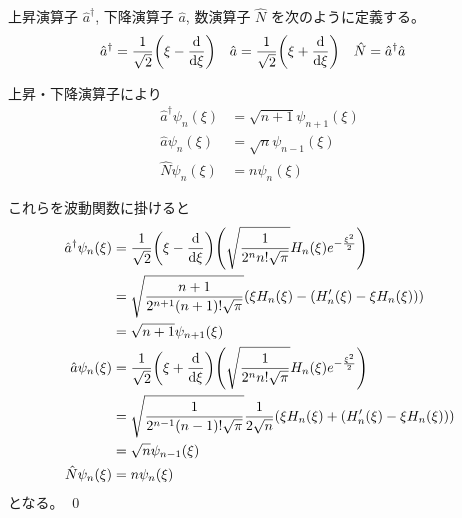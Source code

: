 \documentclass[uplatex,dvipdfmx,a4paper,11pt]{jlreq}
\makeatletter
\numberwithin{equation}{section}
\theoremstyle{definition}
\renewenvironment{proof}[1][\proofname]{\par
  \normalfont
  \topsep6\p@\@plus6\p@ \trivlist
  \item[\hskip\labelsep{\bfseries #1}\@addpunct{\bfseries}]\ignorespaces\quad\par
}{%
  \qed\endtrivlist\@endpefalse
}
\renewcommand\proofname{証明}
\makeatother
\begin{document}
\begin{definition}
  上昇演算子 $\hat{a}^\dagger$, 下降演算子 $\hat{a}$, 数演算子 $\hat{N}$ を次のように定義する。
  \begin{align}
    \hat{a}^\dagger & = \frac{1}{\sqrt{2}}\qty(\xi - \dv{\xi}) & \hat{a} & = \frac{1}{\sqrt{2}}\qty(\xi + \dv{\xi}) & \hat{N} & = \hat{a}^\dagger\hat{a}
  \end{align}
\end{definition}

\begin{proposition}
  上昇・下降演算子により
  \begin{align}
    \hat{a}^\dagger\psi_n(\xi) & = \sqrt{n+1}\psi_{n+1}(\xi) \\
    \hat{a}\psi_n(\xi)         & = \sqrt{n}\psi_{n-1}(\xi)   \\
    \hat{N}\psi_n(\xi)         & = n\psi_n(\xi)
  \end{align}
\end{proposition}
\begin{proof}
  これらを波動関数に掛けると
  \begin{align}
    \hat{a}^\dagger\psi_n(\xi) & = \frac{1}{\sqrt{2}}\qty(\xi - \dv{\xi})\qty(\sqrt{\frac{1}{2^nn!\sqrt{\pi}}}H_n(\xi)e^{-\frac{\xi^2}{2}})   \\
                               & = \sqrt{\frac{n+1}{2^{n+1}(n+1)!\sqrt{\pi}}}\qty(\xi H_n(\xi) - (H_n'(\xi) - \xi H_n(\xi)))                  \\
                               & = \sqrt{n+1}\psi_{n+1}(\xi)                                                                                  \\
    \hat{a}\psi_n(\xi)         & = \frac{1}{\sqrt{2}}\qty(\xi + \dv{\xi})\qty(\sqrt{\frac{1}{2^nn!\sqrt{\pi}}}H_n(\xi)e^{-\frac{\xi^2}{2}})   \\
                               & = \sqrt{\frac{1}{2^{n-1}(n-1)!\sqrt{\pi}}}\frac{1}{2\sqrt{n}}\qty(\xi H_n(\xi) + (H_n'(\xi) - \xi H_n(\xi))) \\
                               & = \sqrt{n}\psi_{n-1}(\xi)                                                                                    \\
    \hat{N}\psi_n(\xi)         & = n\psi_n(\xi)
  \end{align}
  となる。
\end{proof}
\end{document}

